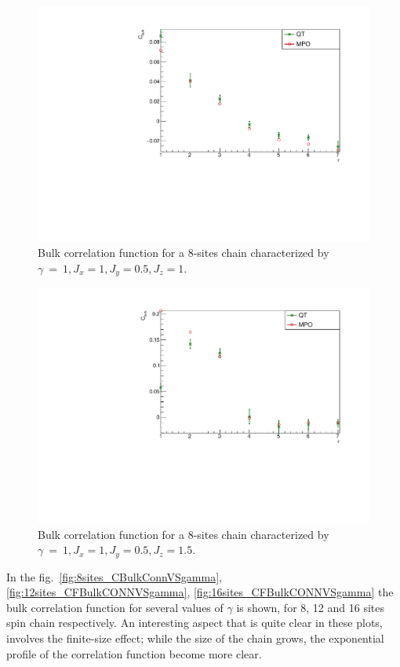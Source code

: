 \begin{figure}[H]
    \centering
    \includegraphics[scale=0.7]{Figures/8sites/CorrFuncBulkCONN_8sJ1051.pdf}
    \caption{Bulk correlation function for a 8-sites chain characterized by $\gamma~=~1, J_x=1, J_y=0.5, J_z=1$.}
    \label{fig:my_label}
\end{figure}

\begin{figure}[H]
    \centering
    \includegraphics[scale=0.7]{Figures/8sites/CorrFuncBulkCONN_8sJ10515.pdf}
    \caption{Bulk correlation function for a 8-sites chain characterized by $\gamma~=~1, J_x=1, J_y=0.5, J_z=1.5$.}
    \label{fig:my_label}
\end{figure}

In the fig.~\ref{fig:8sites_CBulkConnVSgamma}, \ref{fig:12sites_CFBulkCONNVSgamma}, \ref{fig:16sites_CFBulkCONNVSgamma} the bulk correlation function for several values of $\gamma$ is shown, for 8, 12 and 16 sites spin chain respectively. An interesting aspect that is quite clear in these plots, involves the finite-size effect; while the size of the chain grows, the exponential profile of the correlation function become more clear. 

